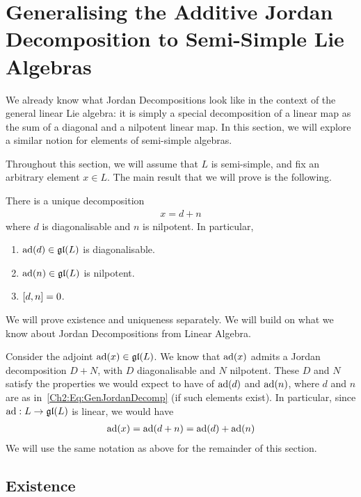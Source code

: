 \section{Generalising the Additive Jordan Decomposition to Semi-Simple Lie Algebras}

We already know what Jordan Decompositions look like in the context of the general linear Lie algebra: it is simply a special decomposition of a linear map as the sum of a diagonal and a nilpotent linear map. In this section, we will explore a similar notion for elements of semi-simple algebras.

Throughout this section, we will assume that $L$ is semi-simple, and fix an arbitrary element $x \in L$. The main result that we will prove is the following.

\begin{boxtheorem}\label{Ch2:Thm:GenJordanDecomp}
    There is a unique decomposition
    \begin{align}
        x = d + n
        \label{Ch2:Eq:GenJordanDecomp}
    \end{align}
    where $d$ is diagonalisable and $n$ is nilpotent. In particular,
    \begin{enumerate}[label = \normalfont \arabic*., noitemsep]
        \item $\operatorname{ad}\!\left( d \right) \in \mathfrak{gl}\!\left( L \right)$ is diagonalisable.
        \item $\operatorname{ad}\!\left( n \right) \in \mathfrak{gl}\!\left( L \right)$ is nilpotent.
        \item $\left[ d, n \right] = 0$.
    \end{enumerate}
\end{boxtheorem}

We will prove existence and uniqueness separately. We will build on what we know about Jordan Decompositions from Linear Algebra.

Consider the adjoint $\operatorname{ad}\!\left( x \right) \in \mathfrak{gl}\!\left( L \right)$. We know that $\operatorname{ad}\!\left( x \right)$ admits a Jordan decomposition $D + N$, with $D$ diagonalisable and $N$ nilpotent. These $D$ and $N$ satisfy the properties we would expect to have of $\operatorname{ad}\!\left( d \right)$ and $\operatorname{ad}\!\left( n \right)$, where $d$ and $n$ are as in~\eqref{Ch2:Eq:GenJordanDecomp} (if such elements exist). In particular, since $\operatorname{ad} : L \to \mathfrak{gl}\!\left( L \right)$ is linear, we would have
\begin{align*}
    \operatorname{ad}\!\left( x \right) = \operatorname{ad}\!\left( d + n \right) = \operatorname{ad}\!\left( d \right) + \operatorname{ad}\!\left( n \right)
\end{align*}
We will use the same notation as above for the remainder of this section.

\subsection{Existence}

